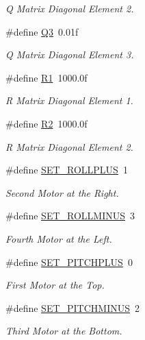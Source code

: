 \begin{DoxyCompactItemize}
\begin{DoxyCompactList}\small\item\em Q Matrix Diagonal Element 2. \end{DoxyCompactList}\item 
\#define \hyperlink{group__config_ga1d7d3dfd2c4618949c484c5e8369f05a}{Q3}~0.\-01f
\begin{DoxyCompactList}\small\item\em Q Matrix Diagonal Element 3. \end{DoxyCompactList}\item 
\#define \hyperlink{group__config_ga918f64eb53db8e8dc694f36a87646476}{R1}~1000.\-0f
\begin{DoxyCompactList}\small\item\em R Matrix Diagonal Element 1. \end{DoxyCompactList}\item 
\#define \hyperlink{group__config_ga7a255a2815b9453060f51c6eb22cfed8}{R2}~1000.\-0f
\begin{DoxyCompactList}\small\item\em R Matrix Diagonal Element 2. \end{DoxyCompactList}\item 
\#define \hyperlink{group__config_ga460dbe0039d252579c5ce8beef7cc709}{S\-E\-T\-\_\-\-R\-O\-L\-L\-P\-L\-U\-S}~1
\begin{DoxyCompactList}\small\item\em Second Motor at the Right. \end{DoxyCompactList}\item 
\#define \hyperlink{group__config_ga9921670161925a1d7b946aeb65d5767a}{S\-E\-T\-\_\-\-R\-O\-L\-L\-M\-I\-N\-U\-S}~3
\begin{DoxyCompactList}\small\item\em Fourth Motor at the Left. \end{DoxyCompactList}\item 
\#define \hyperlink{group__config_gaf0a00d922db66d875ca53f6db34e7307}{S\-E\-T\-\_\-\-P\-I\-T\-C\-H\-P\-L\-U\-S}~0
\begin{DoxyCompactList}\small\item\em First Motor at the Top. \end{DoxyCompactList}\item 
\#define \hyperlink{group__config_ga8c969dbb07dc504226fc2c69484b9768}{S\-E\-T\-\_\-\-P\-I\-T\-C\-H\-M\-I\-N\-U\-S}~2
\begin{DoxyCompactList}\small\item\em Third Motor at the Bottom. \end{DoxyCompactList}\item 

\end{DoxyCompactItemize}
